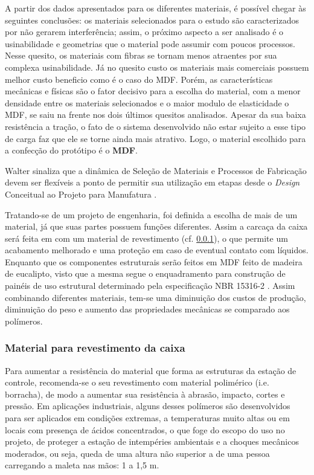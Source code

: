 \par A partir dos dados apresentados para os diferentes materiais, é possível chegar às seguintes conclusões: os materiais selecionados para o estudo são caracterizados por não gerarem interferência; assim, o próximo aspecto a ser analisado é o usinabilidade e geometrias que o material pode assumir com poucos processos. Nesse quesito, os materiais com fibras se tornam menos atraentes por sua complexa usinabilidade. Já no quesito custo os materiais mais comerciais possuem melhor custo beneficio como é o caso do MDF. Porém, as características mecânicas e físicas são o fator decisivo para a escolha do material, com a menor densidade entre os materiais selecionados e o maior modulo de elasticidade o MDF, se saiu na frente nos dois últimos quesitos analisados. Apesar da sua baixa resistência a tração, o fato de o sistema desenvolvido não estar sujeito a esse tipo de carga faz que ele se torne ainda mais atrativo. Logo, o material escolhido para a confecção do protótipo é o \textbf{MDF}.

\par Walter sinaliza que a dinâmica de Seleção de Materiais e Processos de Fabricação devem ser flexíveis a ponto de permitir sua utilização em etapas desde o \textit{Design} Conceitual ao Projeto para Manufatura \cite{walterconteudo}. 

\par Tratando-se de um projeto de engenharia, foi definida a escolha de mais de um material, já que suas partes possuem funções diferentes. Assim a carcaça da caixa será feita em com um material de revestimento (cf. \ref{revestimento}), o que permite um acabamento melhorado e uma proteção em caso de eventual contato com líquidos. Enquanto que os componentes estruturais serão feitos em MDF feito de madeira de eucalipto, visto que a mesma segue o enquadramento para construção de painéis de uso estrutural determinado pela especificação NBR 15316-2 \cite{}. Assim combinando diferentes materiais, tem-se uma diminuição dos custos de produção, diminuição do peso e aumento das propriedades mecânicas se comparado aos polímeros.

\subsubsection{Material para revestimento da caixa}
\label{revestimento}

\par Para aumentar a resistência do material que forma as estruturas da estação de controle, recomenda-se o seu revestimento com material polimérico (i.e. borracha), de modo a aumentar sua resistência à abrasão, impacto, cortes e pressão. Em aplicações industriais, alguns desses polímeros são desenvolvidos para ser aplicados em condições extremas, a temperaturas muito altas ou em locais com presença de ácidos concentrados, o que foge do escopo do uso no projeto, de proteger a estação de intempéries ambientais e a choques mecânicos moderados, ou seja, queda de uma altura não superior a de uma pessoa carregando a maleta nas mãos: 1 a 1,5 m.

